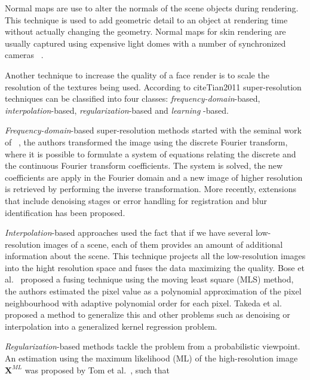 Normal maps are use to alter the normals of the scene objects during rendering.
This technique is used to add geometric detail to an object at rendering time without actually changing the geometry.
Normal maps for skin rendering are usually captured using expensive light domes with a number of synchronized cameras ~\cite{Graham2013, Weyrich2006}. 

Another technique to increase the quality of a face render is to scale the resolution of the textures being used.
According to cite{Tian2011} super-resolution techniques can be classified into four classes: \textit{frequency-domain}-based,	\textit{interpolation}-based, \textit{regularization}-based and \textit{learning }-based.

\textit{Frequency-domain}-based super-resolution methods started with the seminal work of ~\cite{Tsai:1984}, the authors transformed the image using the discrete Fourier transform, where it is possible to formulate a system of equations relating the discrete and the continuous Fourier transform coefficients.
The system is solved, the new coefficients are apply in the Fourier domain and a new image of higher resolution is retrieved by performing the inverse transformation.
More recently, extensions that include denoising stages \cite{Chappalli:2005} or error handling for registration and blur identification \cite{Ji:2009} has been proposed.

\textit{Interpolation}-based approaches used the fact that if we have several low-resolution images of a scene, each of them provides an amount of additional information about the scene.
This technique projects all the low-resolution images into the hight resolution space and fuses the data maximizing the quality.
Bose et al.~\cite{Bose:2006} proposed a fusing technique using the moving least square (MLS) method, the authors estimated the pixel value as a polynomial approximation of the pixel neighbourhood with adaptive polynomial order for each pixel.
Takeda et al.~\cite{Takeda:2007} proposed a method to generalize this and other problems such as denoising or interpolation into a generalized kernel regression problem.

\textit{Regularization}-based methods tackle the problem from a probabilistic viewpoint.
An estimation using the maximum likelihood (ML) of the high-resolution image $\mathbf{X}^{ML}$ was proposed by Tom et al.~\cite{Tom:1995}, such that

